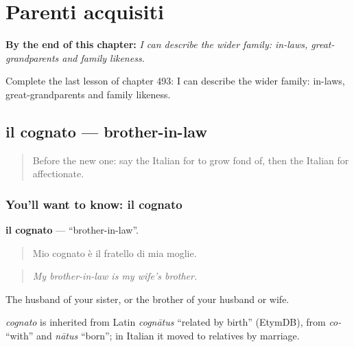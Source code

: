 
\chapter{Parenti acquisiti}
\label{ch:it-parenti-acquisiti}

\begin{chapteropening}
\textbf{By the end of this chapter:} \emph{I can describe the wider family: in-laws, great-grandparents and family likeness.}

Complete the last lesson of chapter 493: I can describe the wider family: in-laws, great-grandparents and family likeness.
\end{chapteropening}

\section[il cognato]{il cognato — brother-in-law}

\label{lesson:IT-C493-cognato}



\begin{quote}
Before the new one: say the Italian for to grow fond of, then the Italian for affectionate.
\end{quote}

\subsection*{You'll want to know: il cognato}
\textbf{il cognato} — \textquotedblleft{}brother-in-law\textquotedblright{}.

\begin{quote}
Mio cognato è il fratello di mia moglie.
\end{quote}

\begin{quote}
\emph{My brother-in-law is my wife's brother.}
\end{quote}

The husband of your sister, or the brother of your husband or wife.

\begin{cousinweb}
\emph{cognato} is inherited from Latin \emph{cognātus} \textquotedblleft{}related by birth\textquotedblright{} (EtymDB), from \emph{co-} \textquotedblleft{}with\textquotedblright{} and \emph{nātus} \textquotedblleft{}born\textquotedblright{}; in Italian it moved to relatives by marriage.
\end{cousinweb}

